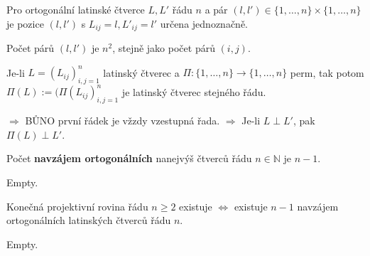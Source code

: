 \begin{pozor}
	Pro ortogonální latinské čtverce $L, L'$ řádu $n$ a pár $(l,l') \in \{ 1, \dots , n\} \times \{ 1, \dots , n\}$ je pozice $(l,l')$ s $L_{ij}=l, L'_{ij}=l'$ určena jednoznačně.
\end{pozor}

\begin{dukaz}
	Počet párů $(l,l')$ je $n^{2}$, stejně jako počet párů $(i,j)$.
\end{dukaz}

\begin{pozor}
	Je-li $L = (L_{ij})_{i,j = 1}^n$ latinský čtverec a $\Pi : \{ 1, \dots , n\} \to \{ 1, \dots , n \}$ perm, tak potom $\Pi (L) := (\Pi (L_{ij})_{i,j =1}^n$ je latinský čtverec stejného řádu.
\end{pozor}

\begin{dukaz}
	$\Rightarrow$ BŮNO první řádek je vžzdy vzestupná řada. $\Rightarrow$ Je-li $L \perp L'$, pak $\Pi (L) \perp L'$.
\end{dukaz}

\begin{dusl}
	Počet \textbf{navzájem ortogonálních} nanejvýš čtverců řádu $n \in \mathbb{N}$ je $n-1$.
\end{dusl}

\begin{dukaz}
	Empty.
\end{dukaz}

\begin{veta}
	Konečná projektivní rovina řádu $n \geq 2$ existuje $\Leftrightarrow$ existuje $n-1$ navzájem ortogonálních latinských čtverců řádu $n$.
\end{veta}

\begin{dukaz}
	Empty.
\end{dukaz}
